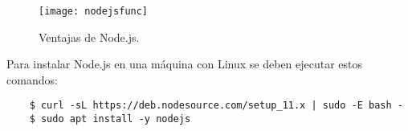\begin{figure}[h]
\centering
\texttt{[image: nodejsfunc]}
\caption{Ventajas de Node.js.}
\label{fig:nodejsVentajas}
\end{figure}



Para instalar Node.js en una máquina con Linux se deben ejecutar estos comandos:
\begin{lstlisting}
    $ curl -sL https://deb.nodesource.com/setup_11.x | sudo -E bash -
    $ sudo apt install -y nodejs
\end{lstlisting}




